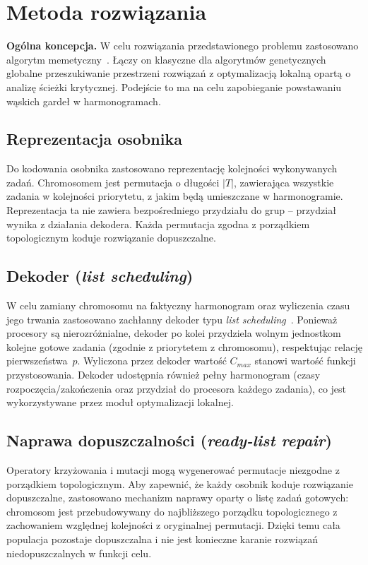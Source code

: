 \documentclass[12pt,a4paper]{article}
\begin{document}
\section{Metoda rozwiązania}
\label{sec:metoda}
\textbf{Ogólna koncepcja.} W celu rozwiązania przedstawionego problemu zastosowano algorytm memetyczny~\cite{moscato1989}. Łączy on klasyczne dla algorytmów genetycznych globalne przeszukiwanie przestrzeni rozwiązań z optymalizacją lokalną opartą o analizę ścieżki krytycznej. Podejście to ma na celu zapobieganie powstawaniu wąskich gardeł w harmonogramach.

\subsection{Reprezentacja osobnika}
Do kodowania osobnika zastosowano reprezentację kolejności wykonywanych zadań. Chromosomem jest permutacja o długości $|T|$, zawierająca wszystkie zadania w kolejności priorytetu, z jakim będą umieszczane w harmonogramie. Reprezentacja ta nie zawiera bezpośredniego przydziału do grup -- przydział wynika z działania dekodera. Każda permutacja zgodna z porządkiem topologicznym koduje rozwiązanie dopuszczalne.

\subsection{Dekoder (\textit{list scheduling})}
W celu zamiany chromosomu na faktyczny harmonogram oraz wyliczenia czasu jego trwania zastosowano zachłanny dekoder typu \textit{list scheduling}~\cite{graham1969}. Ponieważ procesory są nierozróżnialne, dekoder po kolei przydziela wolnym jednostkom kolejne gotowe zadania (zgodnie z priorytetem z chromosomu), respektując relację pierwszeństwa~$p$. Wyliczona przez dekoder wartość $C_{max}$ stanowi wartość funkcji przystosowania. Dekoder udostępnia również pełny harmonogram (czasy rozpoczęcia/zakończenia oraz przydział do procesora każdego zadania), co jest wykorzystywane przez moduł optymalizacji lokalnej.

\subsection{Naprawa dopuszczalności (\textit{ready-list repair})}
Operatory krzyżowania i mutacji mogą wygenerować permutacje niezgodne z porządkiem topologicznym. Aby zapewnić, że każdy osobnik koduje rozwiązanie dopuszczalne, zastosowano mechanizm naprawy oparty o listę zadań gotowych: chromosom jest przebudowywany do najbliższego porządku topologicznego z zachowaniem względnej kolejności z oryginalnej permutacji. Dzięki temu cała populacja pozostaje dopuszczalna i nie jest konieczne karanie rozwiązań niedopuszczalnych w funkcji celu.
\end{document}
